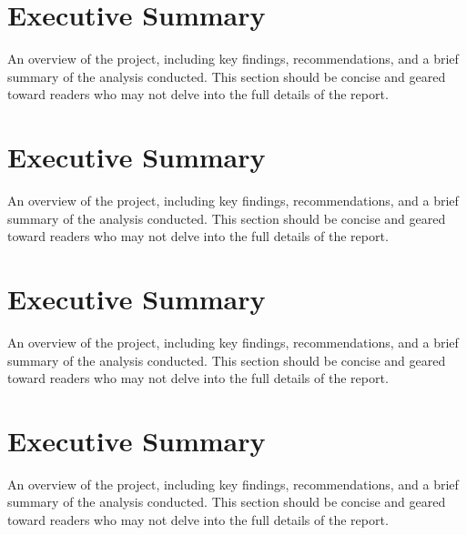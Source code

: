 \documentclass[a4paper,10pt]{article}
\begin{document}
\section{Executive Summary}

An overview of the project, including key findings, recommendations, and a brief summary of the analysis conducted. This section should be concise and geared toward readers who may not delve into the full details of the report. 

\section{Executive Summary}

An overview of the project, including key findings, recommendations, and a brief summary of the analysis conducted. This section should be concise and geared toward readers who may not delve into the full details of the report. 

\section{Executive Summary}

An overview of the project, including key findings, recommendations, and a brief summary of the analysis conducted. This section should be concise and geared toward readers who may not delve into the full details of the report. 

\section{Executive Summary}

An overview of the project, including key findings, recommendations, and a brief summary of the analysis conducted. This section should be concise and geared toward readers who may not delve into the full details of the report. 
\end{document}
